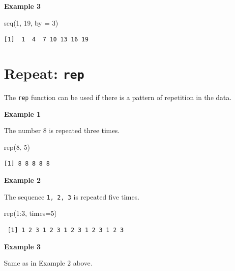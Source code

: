 \documentclass[
  letterpaper,
  DIV=11,
  numbers=noendperiod]{scrreprt}
\newenvironment{Shaded}{\begin{snugshade}}{\end{snugshade}}
\newcommand{\AttributeTok}[1]{\textcolor[rgb]{0.40,0.45,0.13}{#1}}
\newcommand{\DecValTok}[1]{\textcolor[rgb]{0.68,0.00,0.00}{#1}}
\newcommand{\FunctionTok}[1]{\textcolor[rgb]{0.28,0.35,0.67}{#1}}
\newcommand{\NormalTok}[1]{\textcolor[rgb]{0.00,0.23,0.31}{#1}}
\newcommand{\SpecialCharTok}[1]{\textcolor[rgb]{0.37,0.37,0.37}{#1}}
\begin{document}
\textbf{Example 3}

\begin{Shaded}
\begin{Highlighting}[]
\FunctionTok{seq}\NormalTok{(}\DecValTok{1}\NormalTok{, }\DecValTok{19}\NormalTok{, }\AttributeTok{by =} \DecValTok{3}\NormalTok{)}
\end{Highlighting}
\end{Shaded}

\begin{verbatim}
[1]  1  4  7 10 13 16 19
\end{verbatim}

\hypertarget{repeat-rep}{%
\section{\texorpdfstring{Repeat:
\texttt{rep}}{Repeat: rep}}\label{repeat-rep}}

The \texttt{rep} function can be used if there is a pattern of
repetition in the data.

\textbf{Example 1}

The number 8 is repeated three times.

\begin{Shaded}
\begin{Highlighting}[]
\FunctionTok{rep}\NormalTok{(}\DecValTok{8}\NormalTok{, }\DecValTok{5}\NormalTok{)}
\end{Highlighting}
\end{Shaded}

\begin{verbatim}
[1] 8 8 8 8 8
\end{verbatim}

\textbf{Example 2}

The sequence \texttt{1,\ 2,\ 3} is repeated five times.

\begin{Shaded}
\begin{Highlighting}[]
\FunctionTok{rep}\NormalTok{(}\DecValTok{1}\SpecialCharTok{:}\DecValTok{3}\NormalTok{, }\AttributeTok{times=}\DecValTok{5}\NormalTok{)}
\end{Highlighting}
\end{Shaded}

\begin{verbatim}
 [1] 1 2 3 1 2 3 1 2 3 1 2 3 1 2 3
\end{verbatim}

\textbf{Example 3}

Same as in Example 2 above.
\end{document}

